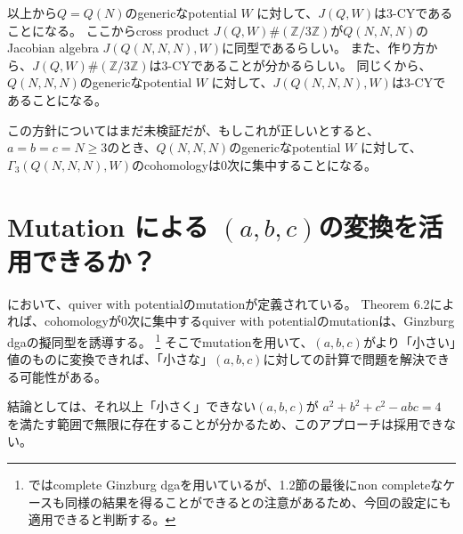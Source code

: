 \documentclass[uplatex,12pt,dvipdfmx]{jsarticle}
\theoremstyle{definition}
\numberwithin{equation}{section}
\newcommand{\Z}{\mathbb{Z}}
\begin{document}
以上から$Q=Q(N)$のgenericなpotential $W$ に対して、$J(Q,W)$は$3$-CYであることになる。
ここからcross product $J(Q,W)\#(\Z/3\Z)$が$Q(N,N,N)$のJacobian algebra $J(Q(N,N,N), W)$に同型であるらしい。
また、作り方から、$J(Q,W)\#(\Z/3\Z)$は$3$-CYであることが分かるらしい。
同じく\cite[Corollary 4.4]{MR2355031}から、$Q(N,N,N)$のgenericなpotential $W$ に対して、$J(Q(N,N,N), W)$は$3$-CYであることになる。

この方針についてはまだ未検証だが、もしこれが正しいとすると、$a=b=c=N\ge 3$のとき、$Q(N,N,N)$のgenericなpotential $W$ に対して、$\Gamma_3(Q(N,N,N), W)$のcohomologyは0次に集中することになる。


\section{Mutation による $(a,b,c)$の変換を活用できるか？}

\cite{MR2739775}において、quiver with potentialのmutationが定義されている。
Theorem 6.2によれば、cohomologyが0次に集中するquiver with potentialのmutationは、Ginzburg dgaの擬同型を誘導する。
\footnote{\cite{MR2739775}ではcomplete Ginzburg dgaを用いているが、1.2節の最後にnon completeなケースも同様の結果を得ることができるとの注意があるため、今回の設定にも適用できると判断する。}
そこでmutationを用いて、$(a,b,c)$がより「小さい」値のものに変換できれば、「小さな」$(a,b,c)$に対しての計算で問題を解決できる可能性がある。

結論としては、それ以上「小さく」できない$(a,b,c)$が $a^2+b^2+c^2-abc=4$ を満たす範囲で無限に存在することが分かるため、このアプローチは採用できない。
\end{document}
